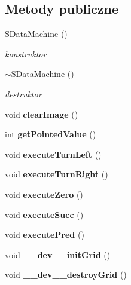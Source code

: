 \subsection*{Metody publiczne}
\begin{CompactItemize}
\item 
\hyperlink{classSDataMachine_3d894df00bd2283c717a827e27138812}{SDataMachine} ()
\begin{CompactList}\small\item\em konstruktor \item\end{CompactList}\item 
\hyperlink{classSDataMachine_59bc85b25930729cbe3046e81f49f909}{$\sim$SDataMachine} ()
\begin{CompactList}\small\item\em destruktor \item\end{CompactList}\item 
\hypertarget{classSDataMachine_06c12baf5a7a4f50dd8f43cc9794dafd}{
void \textbf{clearImage} ()}
\label{classSDataMachine_06c12baf5a7a4f50dd8f43cc9794dafd}

\item 
\hypertarget{classSDataMachine_3a191be9cab718274d6bd75e01cc2a26}{
int \textbf{getPointedValue} ()}
\label{classSDataMachine_3a191be9cab718274d6bd75e01cc2a26}

\item 
\hypertarget{classSDataMachine_5b46d50c18bec1bcfd5232bec3875fd5}{
void \textbf{executeTurnLeft} ()}
\label{classSDataMachine_5b46d50c18bec1bcfd5232bec3875fd5}

\item 
\hypertarget{classSDataMachine_fb6f52c7f14afa51eed848f354d57924}{
void \textbf{executeTurnRight} ()}
\label{classSDataMachine_fb6f52c7f14afa51eed848f354d57924}

\item 
\hypertarget{classSDataMachine_27c3e6dfe9ac45f9d5eed7c97f96abd8}{
void \textbf{executeZero} ()}
\label{classSDataMachine_27c3e6dfe9ac45f9d5eed7c97f96abd8}

\item 
\hypertarget{classSDataMachine_85832e07e2fb8ae32160fe0c95a487d2}{
void \textbf{executeSucc} ()}
\label{classSDataMachine_85832e07e2fb8ae32160fe0c95a487d2}

\item 
\hypertarget{classSDataMachine_87cfad868b3ea0a0e60f776ad3773678}{
void \textbf{executePred} ()}
\label{classSDataMachine_87cfad868b3ea0a0e60f776ad3773678}

\item 
\hypertarget{classSDataMachine_9680a908e0343de539ffd7a83d17dd11}{
void \textbf{\_\-\_\-dev\_\-\_\-initGrid} ()}
\label{classSDataMachine_9680a908e0343de539ffd7a83d17dd11}

\item 
\hypertarget{classSDataMachine_66c35c3c879c06903f306825ccaade7f}{
void \textbf{\_\-\_\-dev\_\-\_\-destroyGrid} ()}
\label{classSDataMachine_66c35c3c879c06903f306825ccaade7f}

\end{CompactItemize}


